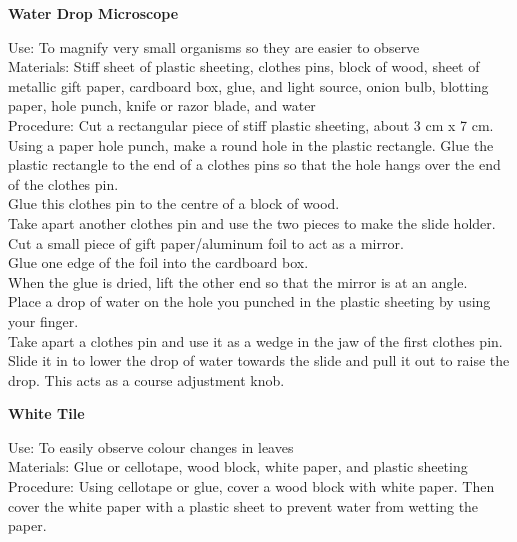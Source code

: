 \begin{flushleft}
\textbf{Water Drop Microscope}
\end{flushleft}
\vspace{-10pt}
Use: To magnify very small organisms so they are easier to observe\\
Materials: Stiff sheet of plastic sheeting, clothes pins, block of wood, sheet of metallic gift paper, cardboard box, glue, and light source, onion bulb, blotting paper, hole punch, knife or razor blade, and water\\
Procedure: Cut a rectangular piece of stiff plastic sheeting, about 3 cm x 7 cm.\\
Using a paper hole punch, make a round hole in the plastic rectangle. Glue the plastic rectangle to the end of a clothes pins so that the hole hangs over the end of the clothes pin.\\
Glue this clothes pin to the centre of a block of wood.\\
Take apart another clothes pin and use the two pieces to make the slide holder.\\
Cut a small piece of gift paper/aluminum foil to act as a mirror.\\
Glue one edge of the foil into the cardboard box.\\
When the glue is dried, lift the other end so that the mirror is at an angle.\\
Place a drop of water on the hole you punched in the plastic sheeting by using your finger.\\
Take apart a clothes pin and use it as a wedge in the jaw of the first clothes pin. Slide it in to lower the drop of water towards the slide and pull it out to raise the drop. This acts as a course adjustment knob.\\

\begin{flushleft}
\textbf{White Tile}
\end{flushleft}
\vspace{-10pt}
Use: To easily observe colour changes in leaves\\
Materials: Glue or cellotape, wood block, white paper, and plastic sheeting\\
Procedure: Using cellotape or glue, cover a wood block with white paper. Then cover the white paper with a plastic sheet to prevent water from wetting the paper.
